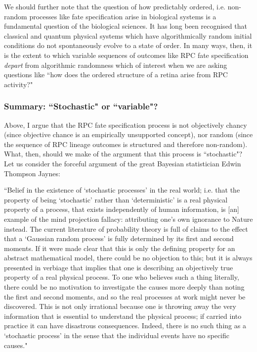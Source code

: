 We should further note that the question of how predictably ordered, i.e. non-random processes like fate specification arise in biological systems is a fundamental question of the biological sciences. It has long been recognised that classical and quantum physical systems which have algorithmically random initial conditions do not spontaneously evolve to a state of order. In many ways, then, it is the extent to which variable sequences of outcomes like RPC fate specification \textit{depart} from algorithmic randomness which of interest when we are asking questions like ``how does the ordered structure of a retina arise from RPC activity?"

\subsubsection{Summary: ``Stochastic" or ``variable"?}

Above, I argue that the RPC fate specification process is not objectively chancy (since objective chance is an empirically unsupported concept), nor random (since the sequence of RPC lineage outcomes is structured and therefore non-random). What, then, should we make of the argument that this process is ``stochastic"? Let us consider the forceful argument of the great Bayesian statistician Edwin Thompson Jaynes:

\begin{longquote}
 ``Belief in the existence of ‘stochastic processes’ in the real world; i.e. that the property of being ‘stochastic’ rather than ‘deterministic’ is a real physical property of a process, that exists independently of human information, is [an] example of the mind projection fallacy: attributing one’s own ignorance to Nature instead. The current literature of probability theory is full of claims to the effect that a ‘Gaussian random process’ is fully determined by its first and second moments. If it were made clear that this is only the defining property for an abstract mathematical model, there could be no objection to this; but it is always presented in verbiage that implies that one is describing an objectively true property of a real physical process. To one who believes such a thing literally, there could be no motivation to investigate the causes more deeply than noting the first and second moments, and so the real processes at work might never be discovered. This is not only irrational because one is throwing away the very information that is essential to understand the physical process; if carried into practice it can have disastrous consequences. Indeed, there is no such thing as a ‘stochastic process’ in the sense that the individual events have no specific causes." \cite{Jaynes2003}
 \end{longquote}
 
